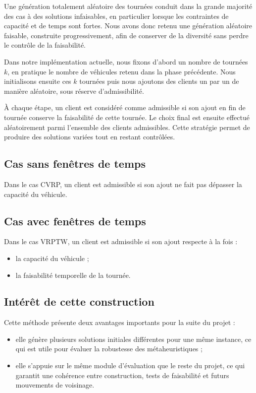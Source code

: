 \documentclass[11pt,a4paper]{article}
\begin{document}
Une génération totalement aléatoire des tournées conduit dans la grande majorité des cas à des solutions infaisables, en particulier lorsque les contraintes de capacité et de temps sont fortes. Nous avons donc retenu une génération aléatoire faisable, construite progressivement, afin de conserver de la diversité sans perdre le contrôle de la faisabilité.

Dans notre implémentation actuelle, nous fixons d'abord un nombre de tournées \(k\), en pratique le nombre de véhicules retenu dans la phase précédente. Nous initialisons ensuite ces \(k\) tournées puis nous ajoutons des clients un par un de manière aléatoire, sous réserve d'admissibilité.

À chaque étape, un client est considéré comme admissible si son ajout en fin de tournée conserve la faisabilité de cette tournée. Le choix final est ensuite effectué aléatoirement parmi l'ensemble des clients admissibles. Cette stratégie permet de produire des solutions variées tout en restant contrôlées.

\subsection{Cas sans fenêtres de temps}
Dans le cas CVRP, un client est admissible si son ajout ne fait pas dépasser la capacité du véhicule.

\subsection{Cas avec fenêtres de temps}
Dans le cas VRPTW, un client est admissible si son ajout respecte à la fois :
\begin{itemize}
    \item la capacité du véhicule ;
    \item la faisabilité temporelle de la tournée.
\end{itemize}

\subsection{Intérêt de cette construction}
Cette méthode présente deux avantages importants pour la suite du projet :
\begin{itemize}
    \item elle génère plusieurs solutions initiales différentes pour une même instance, ce qui est utile pour évaluer la robustesse des métaheuristiques ;
    \item elle s'appuie sur le même module d'évaluation que le reste du projet, ce qui garantit une cohérence entre construction, tests de faisabilité et futurs mouvements de voisinage.
\end{itemize}
\end{document}
